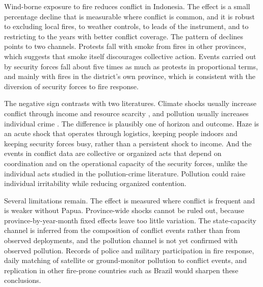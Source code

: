 \documentclass[12pt]{article}
\begin{document}
Wind-borne exposure to fire reduces conflict in Indonesia. The effect is a small percentage decline that is measurable where conflict is common, and it is robust to excluding local fires, to weather controls, to leads of the instrument, and to restricting to the years with better conflict coverage. The pattern of declines points to two channels. Protests fall with smoke from fires in other provinces, which suggests that smoke itself discourages collective action. Events carried out by security forces fall about five times as much as protests in proportional terms, and mainly with fires in the district's own province, which is consistent with the diversion of security forces to fire response.

The negative sign contrasts with two literatures. Climate shocks usually increase conflict through income and resource scarcity \citep{hsiang2013quantifying, burkehsiangmiguel2015}, and pollution usually increases individual crime \citep{herrnstadt2021, bondyrothsager2020, burkhardt2019}. The difference is plausibly one of horizon and outcome. Haze is an acute shock that operates through logistics, keeping people indoors and keeping security forces busy, rather than a persistent shock to income. And the events in conflict data are collective or organized acts that depend on coordination and on the operational capacity of the security forces, unlike the individual acts studied in the pollution-crime literature. Pollution could raise individual irritability while reducing organized contention.

Several limitations remain. The effect is measured where conflict is frequent and is weaker without Papua. Province-wide shocks cannot be ruled out, because province-by-year-month fixed effects leave too little variation. The state-capacity channel is inferred from the composition of conflict events rather than from observed deployments, and the pollution channel is not yet confirmed with observed pollution. Records of police and military participation in fire response, daily matching of satellite or ground-monitor pollution to conflict events, and replication in other fire-prone countries such as Brazil would sharpen these conclusions.



\end{document}
